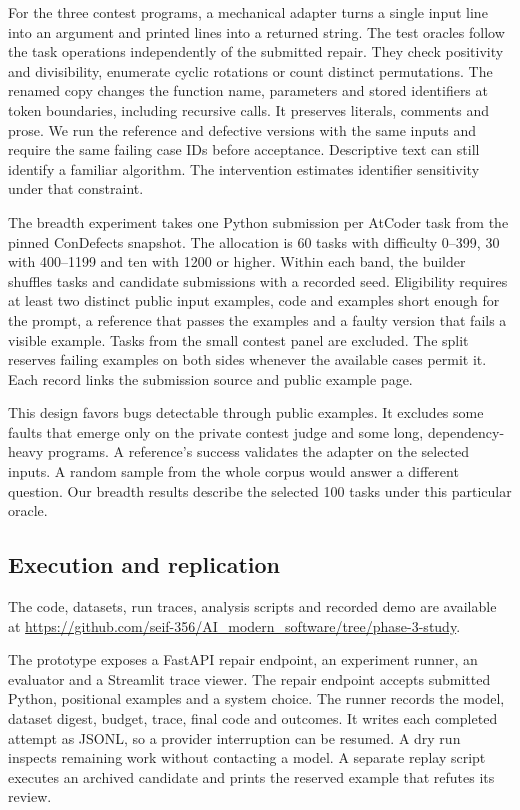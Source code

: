 \documentclass[conference]{IEEEtran}
\begin{document}
For the three contest programs, a mechanical adapter turns a single input line into an argument and printed lines into a returned string. The test oracles follow the task operations independently of the submitted repair. They check positivity and divisibility, enumerate cyclic rotations or count distinct permutations. The renamed copy changes the function name, parameters and stored identifiers at token boundaries, including recursive calls. It preserves literals, comments and prose. We run the reference and defective versions with the same inputs and require the same failing case IDs before acceptance. Descriptive text can still identify a familiar algorithm. The intervention estimates identifier sensitivity under that constraint.

The breadth experiment takes one Python submission per AtCoder task from the pinned ConDefects snapshot. The allocation is 60 tasks with difficulty 0--399, 30 with 400--1199 and ten with 1200 or higher. Within each band, the builder shuffles tasks and candidate submissions with a recorded seed. Eligibility requires at least two distinct public input examples, code and examples short enough for the prompt, a reference that passes the examples and a faulty version that fails a visible example. Tasks from the small contest panel are excluded. The split reserves failing examples on both sides whenever the available cases permit it. Each record links the submission source and public example page.

This design favors bugs detectable through public examples. It excludes some faults that emerge only on the private contest judge and some long, dependency-heavy programs. A reference's success validates the adapter on the selected inputs. A random sample from the whole corpus would answer a different question. Our breadth results describe the selected 100 tasks under this particular oracle.

\subsection{Execution and replication}
The code, datasets, run traces, analysis scripts and recorded demo are available at \url{https://github.com/seif-356/AI_modern_software/tree/phase-3-study}.

The prototype exposes a FastAPI repair endpoint, an experiment runner, an evaluator and a Streamlit trace viewer. The repair endpoint accepts submitted Python, positional examples and a system choice. The runner records the model, dataset digest, budget, trace, final code and outcomes. It writes each completed attempt as JSONL, so a provider interruption can be resumed. A dry run inspects remaining work without contacting a model. A separate replay script executes an archived candidate and prints the reserved example that refutes its review.
\end{document}
